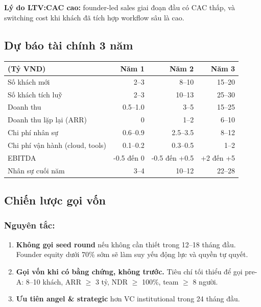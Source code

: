 \documentclass[11pt,a4paper]{article}
\begin{document}
\textbf{Lý do LTV:CAC cao:} founder-led sales giai đoạn đầu có CAC thấp, và
switching cost khi khách đã tích hợp workflow sâu là cao.

\subsection{Dự báo tài chính 3 năm}

\begin{tabularx}{\linewidth}{@{}p{4.5cm} r r r@{}}
\toprule
\textbf{(Tỷ VND)} & \textbf{Năm 1} & \textbf{Năm 2} & \textbf{Năm 3} \\
\midrule
Số khách mới & 2--3 & 8--10 & 15--20 \\
Số khách tích luỹ & 2--3 & 10--13 & 25--30 \\
Doanh thu & 0.5--1.0 & 3--5 & 15--25 \\
Doanh thu lặp lại (ARR) & 0 & 1--2 & 6--10 \\
Chi phí nhân sự & 0.6--0.9 & 2.5--3.5 & 8--12 \\
Chi phí vận hành (cloud, tools) & 0.1--0.2 & 0.3--0.5 & 1--2 \\
EBITDA & -0.5 đến 0 & -0.5 đến +0.5 & +2 đến +5 \\
Nhân sự cuối năm & 3--4 & 10--12 & 22--28 \\
\bottomrule
\end{tabularx}

\subsection{Chiến lược gọi vốn}

\subsubsection*{Nguyên tắc:}

\begin{enumerate}
\item \textbf{Không gọi seed round} nếu không cần thiết trong 12--18 tháng đầu.
Founder equity dưới 70\% sớm sẽ làm suy yếu động lực và quyền tự quyết.

\item \textbf{Gọi vốn khi có bằng chứng, không trước.} Tiêu chí tối thiểu để
gọi pre-A: 8--10 khách, ARR $\geq$ 3 tỷ, NDR $\geq$ 100\%, team $\geq$ 8 người.

\item \textbf{Ưu tiên angel \& strategic} hơn VC institutional trong 24 tháng đầu.
\end{enumerate}
\end{document}

